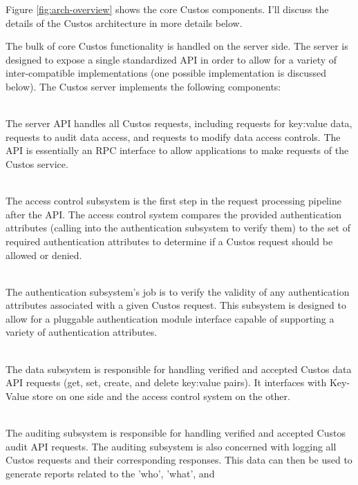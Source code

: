 Figure \ref{fig:arch-overview} shows the core Custos components. I'll
discuss the details of the Custos architecture in more details below.

The bulk of core Custos functionality is handled on the server
side. The server is designed to expose a single standardized API in
order to allow for a variety of inter-compatible implementations (one
possible implementation is discussed below). The Custos server
implements the following components:

\begin{packed_desc}
\item[API] \hfill \\ The server API handles all Custos requests,
  including requests for key:value data, requests to audit data
  access, and requests to modify data access controls. The API is
  essentially an RPC interface to allow applications to make requests
  of the Custos service.
\item[Access Control Subsystem] \hfill \\ The access control subsystem
  is the first step in the request processing pipeline after the
  API. The access control system compares the provided authentication
  attributes (calling into the authentication subsystem to verify
  them) to the set of required authentication attributes to determine
  if a Custos request should be allowed or denied.
\item[Authentication Subsystem] \hfill \\ The authentication
  subsystem's job is to verify the validity of any authentication
  attributes associated with a given Custos request. This subsystem is
  designed to allow for a pluggable authentication module interface
  capable of supporting a variety of authentication attributes.
\item[Data Subsystem] \hfill \\ The data subsystem is responsible for
  handling verified and accepted Custos data API requests (get, set,
  create, and delete key:value pairs). It interfaces with Key-Value
  store on one side and the access control system on the other.
\item[Auditing Subsystem] \hfill \\ The auditing subsystem is
  responsible for handling verified and accepted Custos audit API
  requests. The auditing subsystem is also concerned with logging all
  Custos requests and their corresponding responses. This data can
  then be used to generate reports related to the 'who', 'what', and

\end{packed_desc}
